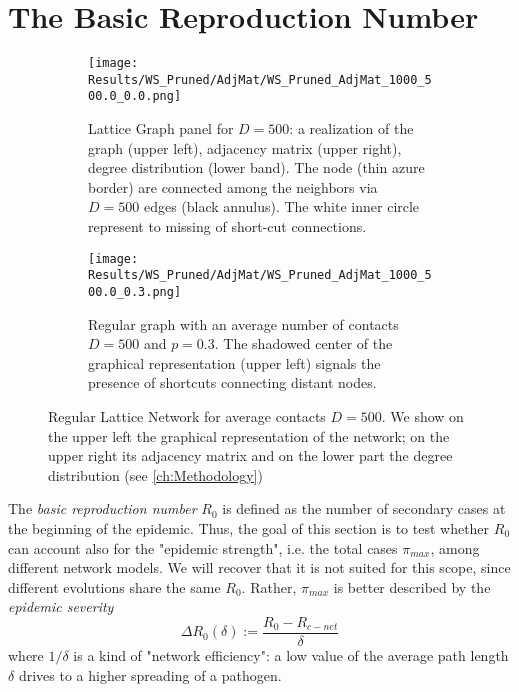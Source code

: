 \documentclass[a4paper,10pt,twoside]{book} %
\theoremstyle{definition}
\begin{document}
\section{The Basic Reproduction Number}
\label{sec:res_RegLat}
\begin{figure}[ht]
	\begin{subfigure}[t]{0.48\linewidth}
		\centering
		\texttt{[image: Results/WS\_Pruned/AdjMat/WS\_Pruned\_AdjMat\_1000\_500.0\_0.0.png]}
		\caption{Lattice Graph panel for $D = 500$: a realization of the graph (upper left), adjacency matrix (upper right), degree distribution (lower band). The node (thin azure border) are connected among the neighbors via $ D = 500$ edges (black annulus). The white inner circle represent to missing of short-cut connections.} 
		\label{fig:net_RegLat_D500}
	\end{subfigure} 
	\hfill
	\begin{subfigure}[t]{0.48\linewidth}
		\centering
		\texttt{[image: Results/WS\_Pruned/AdjMat/WS\_Pruned\_AdjMat\_1000\_500.0\_0.3.png]}
		\caption{Regular graph with an average number of contacts $D = 500$ and $p = 0.3$.
		The shadowed center of the graphical representation (upper left) signals the presence of shortcuts connecting distant nodes.}
		\label{fig:net_RegLat_D500_p0.3}
	\end{subfigure}
	\caption{Regular Lattice Network for average contacts $ D = 500$. We show on the upper left the graphical representation of the network; on the upper right its adjacency matrix and on the lower part the degree distribution (see \autoref{ch:Methodology})}
	\label{fig:net_RegLat}
\end{figure}
The \textit{basic reproduction number} $R_0$ is defined as the number of secondary cases at the beginning of the epidemic. Thus, the goal of this section is to test whether $R_0$ can account also for the "epidemic strength", i.e. the total cases $ \pi_{max}$, among different network models. We will recover that it is not suited for this scope, since different evolutions share the same $ R_0$. 
Rather, $ \pi_{max}$ is better described by the \textit{epidemic severity}  
\begin{equation}
	\Delta R_0(\delta):= \frac{R_0 - R_{c-net}}{\delta}
\end{equation}
where $1/\delta$ is a kind of "network efficiency": a low value of the average path length $ \delta$  drives to a higher spreading of a pathogen.
\end{document}
